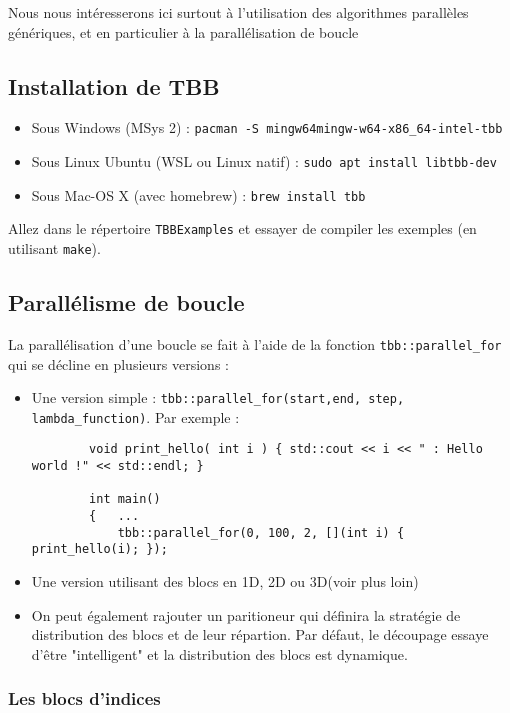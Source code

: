 \documentclass[11pt,a4paper]{article}
\begin{document}
Nous nous intéresserons ici surtout à l'utilisation des algorithmes parallèles génériques, et en particulier à la parallélisation de boucle

\subsection{Installation de TBB}

\begin{itemize}
\item Sous Windows (MSys 2) : \texttt{pacman -S mingw64\/mingw-w64-x86\_64-intel-tbb}
\item Sous Linux Ubuntu (WSL ou Linux natif) : \texttt{sudo apt install libtbb-dev}
\item Sous Mac-OS X (avec homebrew) : \texttt{brew install tbb}
\end{itemize}

Allez dans le répertoire \texttt{TBBExamples} et essayer de compiler les exemples
(en utilisant \texttt{make}).

\subsection{Parallélisme de boucle}

La parallélisation d'une boucle se fait à l'aide de la fonction \texttt{tbb::parallel\_for} qui se décline en plusieurs
versions :
\begin{itemize}
    \item Une version simple : \texttt{tbb::parallel\_for(start,end, step, lambda\_function)}. Par exemple :
    \begin{lstlisting}
        void print_hello( int i ) { std::cout << i << " : Hello world !" << std::endl; }
        
        int main()
        {   ...
            tbb::parallel_for(0, 100, 2, [](int i) { print_hello(i); });        
    \end{lstlisting}
    \item Une version utilisant des blocs en 1D, 2D ou 3D(voir plus loin)
    \item On peut également rajouter un paritioneur qui définira la stratégie de
          distribution des blocs et de leur répartion. Par défaut, le découpage essaye 
          d'être "intelligent" et la distribution des blocs est dynamique.
\end{itemize}

\subsubsection{Les blocs d'indices}
\end{document}
